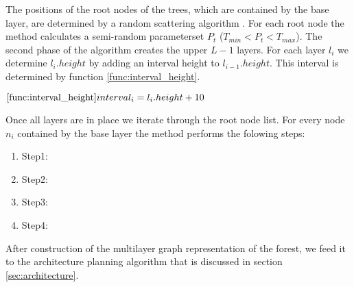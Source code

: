 The positions of the root nodes of the trees, which are contained by the base layer, are determined by a random scattering algorithm \citep{mickwestgamasutra}. For each root node the method calculates a semi-random parameterset $P_t$ ($T_{min} < P_t < T_{max}$). The second phase of the algorithm creates the upper $L-1$ layers. For each layer $l_{i}$ we determine $l_{i}.height$ by adding an interval height to $l_{i-1}.height$. This interval is determined by function \ref{func:interval_height}.   

\begin{math}
\ref{func:interval_height}
 interval_i = l_{i}.height + 10    
\end{math}

Once all layers are in place we iterate through the root node list. For every node $n_i$ contained by the base layer the method performs the folowing steps:  

\begin{enumerate}
\item Step1: 
\item Step2:
\item Step3:
\item Step4:
\end{enumerate}

After construction of the multilayer graph representation of the forest, we feed it to the architecture planning algorithm that is discussed in section \ref{sec:architecture}. 







